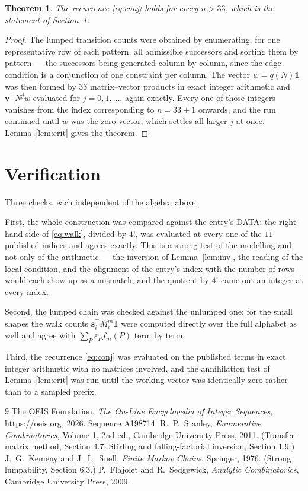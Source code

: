 \documentclass[11pt,a4paper]{article}
\theoremstyle{plain}
\newtheorem{theorem}{Theorem}
\theoremstyle{definition}
\begin{document}
\begin{theorem}
The recurrence \eqref{eq:conj} holds for every $n>33$, which is the statement of
Section~1.
\end{theorem}

\begin{proof}
The lumped transition counts were obtained by enumerating, for one representative row of
each pattern, all admissible successors and sorting them by pattern --- the successors being
generated column by column, since the edge condition is a conjunction of one constraint per
column. The vector $w=q(N)\mathbf{1}$ was then formed by $33$ matrix--vector products
in exact integer arithmetic and $\mathbf{v}^{\!\top}N^{j}w$ evaluated for
$j=0,1,\dots$, again exactly. Every one of those integers vanishes from the index
corresponding to $n=33+1$ onwards, and the run continued until $w$ was the zero vector,
which settles all larger $j$ at once. Lemma~\ref{lem:crit} gives the theorem.
\end{proof}

\section{Verification}

Three checks, each independent of the algebra above.

First, the whole construction was compared against the entry's DATA: the right-hand side of
\eqref{eq:walk}, divided by $4!$, was evaluated at every one of the $11$
published indices and agrees exactly. This is a strong test of the modelling and not only of
the arithmetic --- the inversion of Lemma~\ref{lem:inv}, the reading of the local
condition, and the alignment of the entry's index with the number of rows would each
show up as a mismatch, and the quotient by $4!$ came out an integer at every index.

Second, the lumped chain was checked against the unlumped one: for the small shapes the walk
counts $\mathbf{s}_i^{\!\top}M_i^{m}\mathbf{1}$ were computed directly over the full
alphabet as well and agree with $\sum_P\varepsilon_Pf_m(P)$ term by term.

Third, the recurrence \eqref{eq:conj} was evaluated on the published terms in exact integer
arithmetic with no matrices involved, and the annihilation test of Lemma~\ref{lem:crit} was
run until the working vector was identically zero rather than to a sampled prefix.

\begin{thebibliography}{9}
 The OEIS Foundation, \emph{The On-Line Encyclopedia of Integer
Sequences}, \url{https://oeis.org}, 2026. Sequence A198714.
 R.~P.~Stanley, \emph{Enumerative Combinatorics}, Volume 1, 2nd ed.,
Cambridge University Press, 2011. (Transfer-matrix method, Section 4.7; Stirling and
falling-factorial inversion, Section 1.9.)
 J.~G.~Kemeny and J.~L.~Snell, \emph{Finite Markov Chains}, Springer,
1976. (Strong lumpability, Section 6.3.)
 P.~Flajolet and R.~Sedgewick, \emph{Analytic Combinatorics}, Cambridge
University Press, 2009.
\end{thebibliography}
\end{document}
